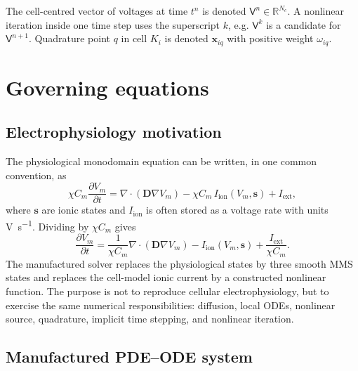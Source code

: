 \documentclass[11pt,a4paper]{article}
\newcommand{\Vm}{V_m}
\newcommand{\Iion}{I_{\mathrm{ion}}}
\newcommand{\Dten}{\mathbf{D}}
\newcommand{\grad}{\nabla}
\newcommand{\divg}{\nabla\!\cdot}
\newcommand{\R}{\mathbb{R}}
\begin{document}
The cell-centred vector of voltages at time $t^n$ is denoted
$\mathsf{V}^n\in\R^{N_c}$. A nonlinear iteration inside one time step uses the
superscript $k$, e.g. $\mathsf{V}^k$ is a candidate for
$\mathsf{V}^{n+1}$. Quadrature point $q$ in cell $K_i$ is denoted
$\mathbf{x}_{iq}$ with positive weight $\omega_{iq}$.

\section{Governing equations}

\subsection{Electrophysiology motivation}

The physiological monodomain equation can be written, in one common convention,
as
\begin{equation}
  \chi C_m \frac{\partial \Vm}{\partial t}
  =
  \divg(\Dten \grad \Vm)
  - \chi C_m\,\Iion(\Vm,\mathbf{s})
  + I_{\mathrm{ext}},
  \label{eq:phys-monodomain}
\end{equation}
where $\mathbf{s}$ are ionic states and $\Iion$ is often stored as a voltage
rate with units \si{\volt\per\second}. Dividing by $\chi C_m$ gives
\begin{equation}
  \frac{\partial \Vm}{\partial t}
  =
  \frac{1}{\chi C_m}\divg(\Dten\grad\Vm)
  - \Iion(\Vm,\mathbf{s})
  + \frac{I_{\mathrm{ext}}}{\chi C_m}.
\end{equation}
The manufactured solver replaces the physiological states by three smooth MMS
states and replaces the cell-model ionic current by a constructed nonlinear
function. The purpose is not to reproduce cellular electrophysiology, but to
exercise the same numerical responsibilities: diffusion, local ODEs, nonlinear
source, quadrature, implicit time stepping, and nonlinear iteration.

\subsection{Manufactured PDE--ODE system}
\end{document}

